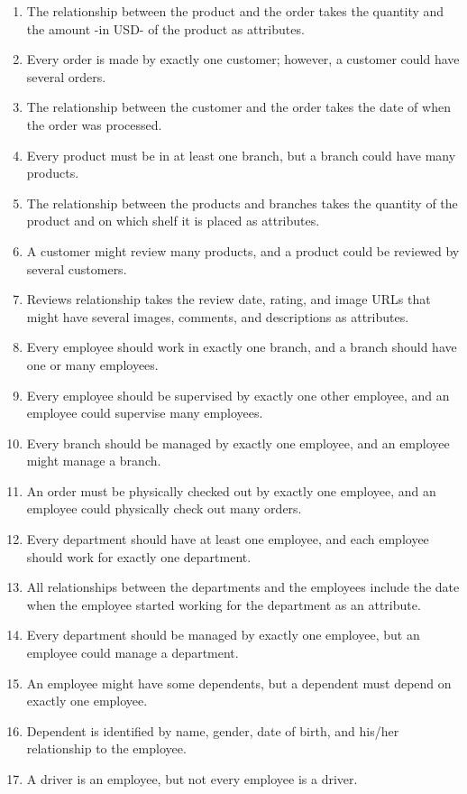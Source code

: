 \begin{enumerate}
  \item The relationship between the product and the order takes the quantity and the amount -in USD- of the product as attributes.
  \item Every order is made by exactly one customer; however, a customer could have several orders.
  \item The relationship between the customer and the order takes the date of when the order was processed.
  \item Every product must be in at least one branch, but a branch could have many products.
  \item The relationship between the products and branches takes the quantity of the product and on which shelf it is placed as attributes.
  \item A customer might review many products, and a product could be reviewed by several customers.
  \item Reviews relationship takes the review date, rating, and image URLs that might have several images, comments, and descriptions as attributes.
  \item Every employee should work in exactly one branch, and a branch should have one or many employees.
  \item Every employee should be supervised by exactly one other employee, and an employee could supervise many employees.
  \item Every branch should be managed by exactly one employee, and an employee might manage a branch.
  \item An order must be physically checked out by exactly one employee, and an employee could physically check out many orders.
  \item Every department should have at least one employee, and each employee should work for exactly one department.
  \item All relationships between the departments and the employees include the date when the employee started working for the department as an attribute.
  \item Every department should be managed by exactly one employee, but an employee could manage a department.
  \item An employee might have some dependents, but a dependent must depend on exactly one employee.
  \item Dependent is identified by name, gender, date of birth, and his/her relationship to the employee.
  \item A driver is an employee, but not every employee is a driver.

\end{enumerate}
